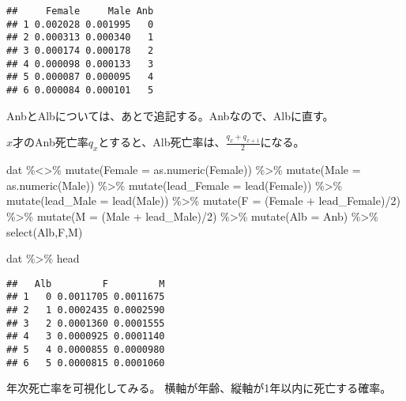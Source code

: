 \documentclass[
]{book}
\newenvironment{Shaded}{\begin{snugshade}}{\end{snugshade}}
\newcommand{\AttributeTok}[1]{\textcolor[rgb]{0.77,0.63,0.00}{#1}}
\newcommand{\DecValTok}[1]{\textcolor[rgb]{0.00,0.00,0.81}{#1}}
\newcommand{\FunctionTok}[1]{\textcolor[rgb]{0.00,0.00,0.00}{#1}}
\newcommand{\NormalTok}[1]{#1}
\newcommand{\SpecialCharTok}[1]{\textcolor[rgb]{0.00,0.00,0.00}{#1}}
\begin{document}
\begin{verbatim}
##     Female     Male Anb
## 1 0.002028 0.001995   0
## 2 0.000313 0.000340   1
## 3 0.000174 0.000178   2
## 4 0.000098 0.000133   3
## 5 0.000087 0.000095   4
## 6 0.000084 0.000101   5
\end{verbatim}

AnbとAlbについては、あとで追記する。Anbなので、Albに直す。

\(x\)才のAnb死亡率\(q_x\)とすると、Alb死亡率は、\(\frac{q_x+q_{x+1}}{2}\)になる。

\begin{Shaded}
\begin{Highlighting}[]
\NormalTok{dat }\SpecialCharTok{\%\textless{}\textgreater{}\%}
        \FunctionTok{mutate}\NormalTok{(}\AttributeTok{Female =} \FunctionTok{as.numeric}\NormalTok{(Female)) }\SpecialCharTok{\%\textgreater{}\%}
        \FunctionTok{mutate}\NormalTok{(}\AttributeTok{Male =} \FunctionTok{as.numeric}\NormalTok{(Male)) }\SpecialCharTok{\%\textgreater{}\%} 
        \FunctionTok{mutate}\NormalTok{(}\AttributeTok{lead\_Female =} \FunctionTok{lead}\NormalTok{(Female)) }\SpecialCharTok{\%\textgreater{}\%} 
        \FunctionTok{mutate}\NormalTok{(}\AttributeTok{lead\_Male =} \FunctionTok{lead}\NormalTok{(Male)) }\SpecialCharTok{\%\textgreater{}\%} 
        \FunctionTok{mutate}\NormalTok{(}\AttributeTok{F =}\NormalTok{ (Female }\SpecialCharTok{+}\NormalTok{ lead\_Female)}\SpecialCharTok{/}\DecValTok{2}\NormalTok{) }\SpecialCharTok{\%\textgreater{}\%} 
        \FunctionTok{mutate}\NormalTok{(}\AttributeTok{M =}\NormalTok{ (Male }\SpecialCharTok{+}\NormalTok{ lead\_Male)}\SpecialCharTok{/}\DecValTok{2}\NormalTok{) }\SpecialCharTok{\%\textgreater{}\%} 
        \FunctionTok{mutate}\NormalTok{(}\AttributeTok{Alb =}\NormalTok{ Anb) }\SpecialCharTok{\%\textgreater{}\%} 
        \FunctionTok{select}\NormalTok{(Alb,F,M)}

\NormalTok{dat }\SpecialCharTok{\%\textgreater{}\%}\NormalTok{ head}
\end{Highlighting}
\end{Shaded}

\begin{verbatim}
##   Alb         F         M
## 1   0 0.0011705 0.0011675
## 2   1 0.0002435 0.0002590
## 3   2 0.0001360 0.0001555
## 4   3 0.0000925 0.0001140
## 5   4 0.0000855 0.0000980
## 6   5 0.0000815 0.0001060
\end{verbatim}

年次死亡率を可視化してみる。
横軸が年齢、縦軸が1年以内に死亡する確率。
\end{document}
